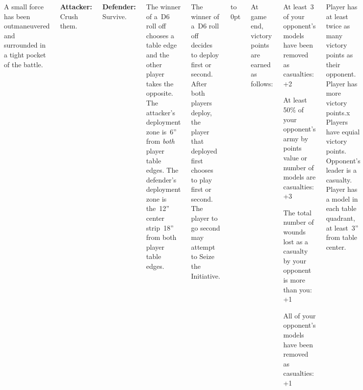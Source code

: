 
\begin{columns}

  A small force has been outmaneuvered and surrounded in a tight
  pocket of the battle.

{\bf Attacker:} Crush them.

{\bf Defender:} Survive.

%

The winner of a~D6 roll off chooses a table edge and the other player
takes the opposite.  The attacker's deployment zone is~6'' from
\emph{both} player table edges.  The defender's deployment zone is
the~12'' center strip~18'' from both player table edges.


%

The winner of a~D6 roll off decides to deploy first or second.  After
both players deploy, the player that deployed first chooses to play
first or second.  The player to go second may attempt to Seize the
Initiative.

\vfill

\vbox to 0pt{}

\columnbreak
At game end, victory points are earned as follows:

\begin{squishitemize}
\item At least~3 of your opponent's models have been removed as
  casualties: +2

\item At least 50\% of your opponent's army by points value or number
  of models are casualties: +3

\item The total number of wounds lost as a casualty by your opponent
  is more than you: +1

\item All of your opponent's models have been removed as casualties:
  +1
\end{squishitemize}

\vspace*{-2pt}

\scoringbox%
{Player has at least twice as many victory points as their opponent.}%
{Player has more victory points.x}%
{Players have equial victory points.}%
{Opponent's leader is a casualty.}%
{Player has a model in each table quadrant, at least~3'' from table center.}

\end{columns}
